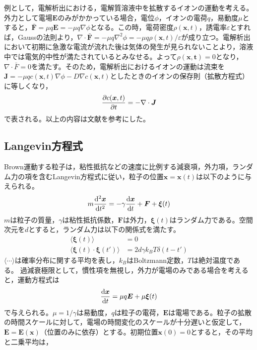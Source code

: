 \documentclass[autodetect-engine,dvi=dvipdfmx,a4paper,ja=standard,oneside,openany,11pt]{bxjsbook}
\begin{document}
例として，電解析出における，電解質溶液中を拡散するイオンの運動を考える。外力として電場$\bm{E}$のみがかかっている場合，電位$\phi$，イオンの電荷$q$，易動度$\mu$とすると，$\bm{\bar{F}}=\mu q\bm{E}=-\mu q \nabla\phi$となる。この時，電荷密度$\rho(\bm{x},t)$，誘電率$\varepsilon$とすれば，Gaussの法則より，$\nabla\cdot\bm{\bar{F}}=-\mu q \nabla^2\phi=-\mu q \rho(\bm{x},t)/\varepsilon$が成り立つ。電解析出において初期に急激な電流が流れた後は気体の発生が見られないことより，溶液中では電気的中性が満たされているとみなせる。よって$\rho(\bm{x,t})=0$となり，$\nabla\cdot\bar{F}=0$を満たす。そのため，電解析出におけるイオンの運動は流束を$\bm{J}=-\mu qc(\bm{x},t) \nabla\phi-D\nabla c(\bm{x},t)$としたときのイオンの保存則（拡散方程式）に等しくなり，
\begin{equation}
  \pdv{c(\bm{x},t)}{t}=-\nabla\cdot\bm{J}
  \label{eq:RW_diffusion_result_divergence_ion}
\end{equation}
で表される。以上の内容は文献\cite{フラクタルの物理Ⅱ}\cite{フラクタル科学}を参考にした。
\subsection{Langevin方程式}
\label{sec:Langevin}
Brown運動する粒子は，粘性抵抗などの速度に比例する減衰項，外力項，ランダム力の項を含むLangevin方程式に従い，粒子の位置$\bm{x}=\bm{x}(t)$は以下のように与えられる。
\begin{equation}
  m\odv[2]{\bm{x}}{t}=-\gamma\odv{\bm{x}}{t}+\bm{F}+\bm{\xi}(t)
  \label{eq:Langevin}
\end{equation}
$m$は粒子の質量，$\gamma$は粘性抵抗係数，$\bm{F}$は外力，$\bm{\xi}(t)$はランダム力である。空間次元を$d$とすると，ランダム力は以下の関係式を満たす。
\begin{equation}
  \begin{split}
    \langle\bm{\xi}(t)\rangle                  & =0                          \\
    \langle\bm{\xi}(t)\cdot\bm{\xi}(t')\rangle & =2d\gamma k_B T\delta(t-t')
  \end{split}
  \label{eq:random_force}
\end{equation}
$\langle\cdots\rangle$は確率分布に関する平均を表し，$k_B$はBoltzmann定数，$T$は絶対温度である。
過減衰極限として，慣性項を無視し，外力が電場のみである場合を考えると，運動方程式は
\begin{equation}
  \odv{\bm{x}}{t}=\mu q\bm{E}+\mu\bm{\xi}(t)
  \label{eq:Langevin_overdamped}
\end{equation}
で与えられる。$\mu=1/\gamma$は易動度，$q$は粒子の電荷，$\bm{E}$は電場である。粒子の拡散の時間スケールに対して，電場の時間変化のスケールが十分遅いと仮定して，$\bm{E}=\bm{E}(\bm{x})$（位置のみに依存）とする。初期位置$\bm{x}(0)=0$とすると，その平均と二乗平均は，
\end{document}
